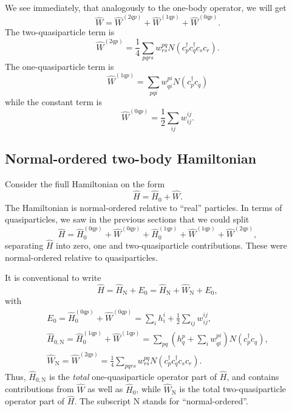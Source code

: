 \documentclass{report}
\theoremstyle{plain}
\theoremstyle{definition}
\begin{document}
We see immediately, that analogously to the one-body operator, we will
get
\begin{equation}
  \hat{W} = \hat{W}^{(2qp)} + \hat{W}^{(1qp)} + \hat{W}^{(0qp)}.
\end{equation}
The two-quasiparticle term is
\begin{equation}
  \hat{W}^{(2qp)} = \frac{1}{4}\sum_{pqrs} w^{pq}_{rs} N(c^\dag_p
  c^\dag_q c_s c_r).
\end{equation}
The one-quasiparticle term is
\begin{equation}
  \hat{W}^{(1qp)} = \sum_{pqi} w^{pi}_{qi} N(c^\dag_p c_q)
\end{equation}
while the constant term is
\begin{equation}
  \hat{W}^{(0qp)} = \frac{1}{2}\sum_{ij} w^{ij}_{ij}.
\end{equation}

\subsection{Normal-ordered two-body Hamiltonian}

Consider the fiull Hamiltonian on the form
\begin{equation}
  \hat{H} = \hat{H}_0 + \hat{W}.
\end{equation}
The Hamiltonian is normal-ordered relative to ``real'' particles. In
terms of quasiparticles, we saw in the previous sections that we could
split
\begin{equation}
  \hat{H} = \hat{H}_0^{(0qp)} + \hat{W}^{(0qp)}  + \hat{H}_0^{(1qp)} +
  \hat{W}^{(1qp)} + \hat{W}^{(2qp)},
\end{equation}
separating $\hat{H}$ into zero, one and two-quasiparticle
contributions. These were normal-ordered relative to quasiparticles.

It is conventional to write
\begin{equation}
  \hat{H} = \hat{H}_\text{N} + E_0 = \hat{H}_\text{N} +
  \hat{W}_\text{N} + E_0,
\end{equation}
with
\begin{subequations}
\begin{gather}
  E_0 = \hat{H}_0^{(0qp)} + \hat{W}^{(0qp)} = \sum_i h^i_i +
  \frac{1}{2}\sum_{ij} w^{ij}_{ij} , \\
  \hat{H}_{0,\text{N}} = \hat{H}_0^{(1qp)} + \hat{W}^{(1qp)} = \sum_{pq}
  (h^p_q + \sum_i w^{pi}_{qi}) N(c^\dag_p c_q) , \\
  \hat{W}_\text{N} = \hat{W}^{(2qp)} = \frac{1}{4}\sum_{pqrs}
  w^{pq}_{rs} N(c^\dag_p c^\dag_q c_s c_r) . 
\end{gather}
\end{subequations}
Thus, $\hat{H}_{0,\text{N}}$ is the \emph{total} one-quasiparticle operator part
of $\hat{H}$, and contains contributions from $\hat{W}$ as well as $\hat{H}_0$, while
$\hat{W}_\text{N}$ is the total two-quasiparticle operator part of
$\hat{H}$. The subscript N stands for ``normal-ordered''.
\end{document}
